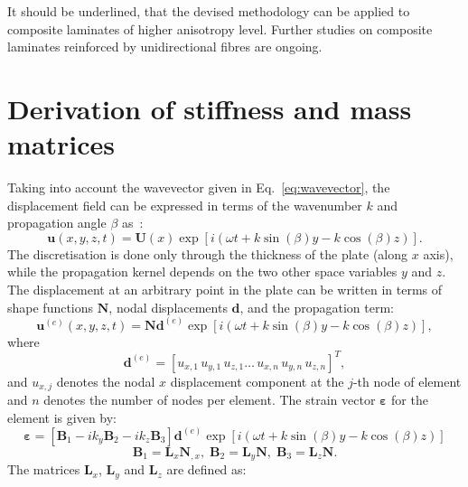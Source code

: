 \documentclass[preprint,12pt]{elsarticle}
\newcommand{\matr}[1]{\mathbf{#1}} %
\newcommand{\vect}[1]{\mathbf{#1}} %
\newcommand{\bs}[1]{\boldsymbol{#1}}
\begin{document}
	It should be underlined, that the devised methodology can be applied to composite laminates of higher anisotropy level. Further studies on composite laminates reinforced by unidirectional fibres are ongoing.
	 
	\appendix
	 \section{Derivation of stiffness and mass matrices}
	 Taking into account the wavevector given in Eq.~\ref{eq:wavevector}, the displacement field can be expressed in terms of the wavenumber $k$ and propagation angle $\beta$ as~\cite{Taupin2011}:
	  \begin{equation}
	 \vect{u}(x,y,z,t) = \matr{U}(x) \exp \left[ i (\omega t + k \sin (\beta) y - k \cos (\beta) z)\right].
	 \end{equation}
	 The discretisation is done only through the thickness of the plate (along $x$ axis), while the propagation kernel depends on the two other space variables $y$ and $z$. The displacement at an arbitrary point in the plate can be written in terms of shape functions $ \matr{N}$, nodal displacements $ \vect{d}$, and the propagation term:
	 \begin{equation}
	 \vect{u}^{(e)}(x,y,z,t) = \matr{N} \vect{d}^{(e)} \exp \left[ i (\omega t + k \sin (\beta) y - k \cos (\beta) z)\right],
	 \end{equation}
	 where
	 \begin{equation}
	 \vect{d}^{(e)} =  \left[ u_{x,1} \, u_{y,1} \, u_{z,1} \ldots  \, u_{x,n} \, u_{y,n} \, u_{z,n} \right]^T,
	 \end{equation}
	 and $u_{x,j}$ denotes the nodal $x$ displacement component at the $j$-th node of element and $n$ denotes the number of nodes per element.
	 The strain vector $\bs{\varepsilon}$ for the element is given by:
	  \begin{equation}
	 \bs{\varepsilon}= \left[ \matr{B}_1 -i k_y \matr{B}_2 -i k_z \matr{B}_3 \right] \vect{d}^{(e)} \exp \left[ i (\omega t + k \sin (\beta) y - k \cos (\beta) z)\right]
	 \end{equation}
	  \begin{equation}
	 \matr{B}_1= \matr{L}_x \matr{N}_{,x},\; \matr{B}_2= \matr{L}_y \matr{N},\; \matr{B}_3= \matr{L}_z \matr{N}.
	 \end{equation}
	 The matrices $ \matr{L}_x $,  $ \matr{L}_y $ and  $ \matr{L}_z $ are defined as:
\end{document}
